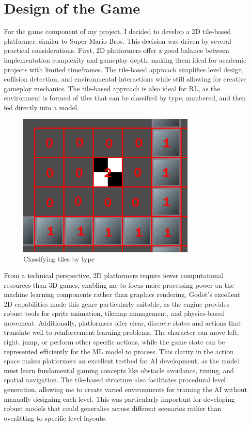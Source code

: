 \section{Design of the Game}

For the game component of my project, I decided to develop a 2D tile-based platformer, similar to Super Mario Bros. 
This decision was driven by several practical considerations. 
First, 2D platformers offer a good balance between implementation complexity and gameplay depth, making them ideal for academic projects with limited timeframes.
The tile-based approach simplifies level design, collision detection, and environmental interactions while still allowing for creative gameplay mechanics. 
The tile-based approach is also ideal for RL, as the environment is formed of tiles that can be classified by type, numbered, and then fed directly into a model.

\begin{figure}[H]
    \centering
    \includegraphics[width=0.8\textwidth]{figures/tilemap.png}
    \caption{Classifying tiles by type}
    \label{fig:tilemap}
\end{figure}

From a technical perspective, 2D platformers require fewer computational resources than 3D games, enabling me to focus more processing power on the machine learning components rather than graphics rendering. 
Godot's excellent 2D capabilities made this genre particularly suitable, as the engine provides robust tools for sprite animation, tilemap management, and physics-based movement.
Additionally, platformers offer clear, discrete states and actions that translate well to reinforcement learning problems. 
The character can move left, right, jump, or perform other specific actions, while the game state can be represented efficiently for the ML model to process.
This clarity in the action space makes platformers an excellent testbed for AI development, as the model must learn fundamental gaming concepts like obstacle avoidance, timing, and spatial navigation.
The tile-based structure also facilitates procedural level generation, allowing me to create varied environments for training the AI without manually designing each level. 
This was particularly important for developing robust models that could generalise across different scenarios rather than overfitting to specific level layouts.


